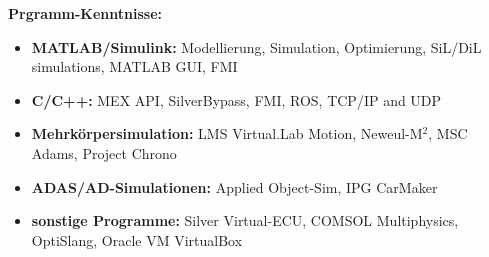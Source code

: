 \documentclass{mycv}
\begin{document}
\begin{paracol}{2}
    {
        {\bfseries Prgramm-Kenntnisse:}
        \begin{itemize}
            \item {\bfseries MATLAB/Simulink:} Modellierung, Simulation,
                Optimierung, SiL/DiL simulations, MATLAB GUI, FMI
            \item {\bfseries C/C++:} MEX API, SilverBypass, FMI, ROS, TCP/IP and UDP
            \item{\bfseries Mehrk{\"o}rpersimulation:}  LMS Virtual.Lab Motion, Neweul-M$^2$, 
                MSC Adams, Project Chrono
            \item{\bfseries ADAS/AD-Simulationen:} Applied Object-Sim, IPG CarMaker
            \item {\bfseries sonstige Programme:}  Silver Virtual-ECU, COMSOL
                Multiphysics, OptiSlang, Oracle VM VirtualBox
        \end{itemize} \par

}
\end{paracol}
\end{document}
